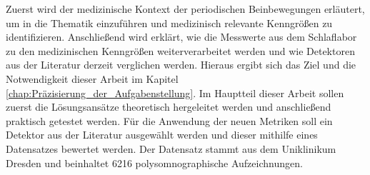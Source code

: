 Zuerst wird der medizinische Kontext der periodischen Beinbewegungen erläutert, um in die Thematik einzuführen und medizinisch relevante Kenngrößen zu identifizieren.
Anschließend wird erklärt, wie die Messwerte aus dem Schlaflabor zu den medizinischen Kenngrößen weiterverarbeitet werden und wie Detektoren aus der Literatur derzeit verglichen werden. 
Hieraus ergibt sich das Ziel und die Notwendigkeit dieser Arbeit im Kapitel \ref{chap:Präzisierung_der_Aufgabenstellung}.
Im Hauptteil dieser Arbeit sollen zuerst die Lösungsansätze theoretisch hergeleitet werden und anschließend praktisch getestet werden. Für die Anwendung der neuen Metriken soll ein Detektor aus der Literatur ausgewählt werden und dieser mithilfe eines Datensatzes bewertet werden. Der Datensatz stammt aus dem Uniklinikum Dresden und beinhaltet 6216 polysomnographische Aufzeichnungen.
